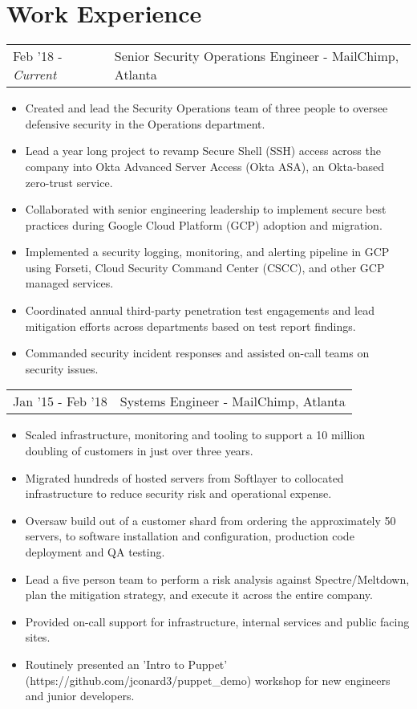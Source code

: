 \documentclass[letterpaper]{article}
\begin{document}
\section*{Work Experience}
\begin{tabular}{l|l}
{Feb '18 - \emph{Current}} & Senior Security Operations Engineer - MailChimp, Atlanta\\
\end{tabular}
\begin{itemize}[noitemsep]
	\item Created and lead the Security Operations team of three people to oversee defensive security in the Operations department.
	\item Lead a year long project to revamp Secure Shell (SSH) access across the company into Okta Advanced Server Access (Okta ASA), an Okta-based zero-trust service. 
	\item Collaborated with senior engineering leadership to implement secure best practices during Google Cloud Platform (GCP) adoption and migration.
	\item Implemented a security logging, monitoring, and alerting pipeline in GCP using Forseti, Cloud Security Command Center (CSCC), and other GCP managed services.
	\item Coordinated annual third-party penetration test engagements and lead mitigation efforts across departments based on test report findings.
	\item Commanded security incident responses and assisted on-call teams on security issues.
\end{itemize}
\begin{tabular}{l|l}
{Jan '15 - Feb '18} & Systems Engineer - MailChimp, Atlanta\\
\end{tabular}
\begin{itemize}[noitemsep]
	\item Scaled infrastructure, monitoring and tooling to support a 10 million doubling of customers in just over three years.
	\item Migrated hundreds of hosted servers from Softlayer to collocated infrastructure to reduce security risk and operational expense.
	\item Oversaw build out of a customer shard from ordering the approximately 50 servers, to software installation and configuration, production code deployment and QA testing.
	\item Lead a five person team to perform a risk analysis against Spectre/Meltdown, plan the mitigation strategy, and execute it across the entire company.
	\item Provided on-call support for infrastructure, internal services and public facing sites.
	\item Routinely presented an 'Intro to Puppet' (https://github.com/jconard3/puppet\_demo) workshop for new engineers and junior developers.
\end{itemize}
\end{document}
